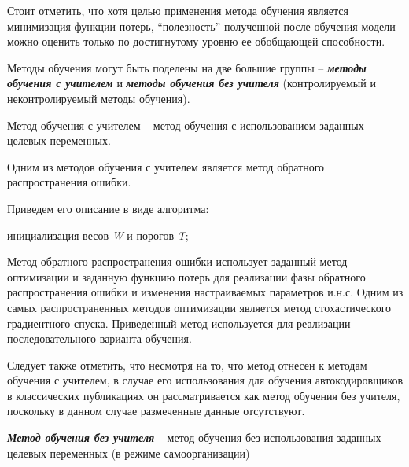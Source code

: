 Стоит отметить, что хотя целью применения метода обучения является минимизация функции потерь, ``полезность'' полученной после обучения модели можно оценить только по достигнутому уровню ее обобщающей способности.

Методы обучения могут быть поделены на две большие группы -- \textit{\textbf{методы обучения с учителем}} и \textit{\textbf{методы обучения без учителя}} (контролируемый и неконтролируемый методы обучения).

Метод обучения с учителем -- метод обучения с использованием заданных целевых переменных.

Одним из методов обучения с учителем является метод обратного распространения ошибки.

Приведем его описание в виде алгоритма:

\begin{algorithm}[H]
	инициализация весов \textit{W} и порогов \textit{T};\\
\end{algorithm}

Метод обратного распространения ошибки использует заданный метод оптимизации и заданную функцию потерь для реализации фазы обратного распространения ошибки и изменения настраиваемых параметров и.н.с. Одним из самых распространенных методов оптимизации является метод стохастического градиентного спуска. Приведенный метод используется для реализации последовательного варианта обучения.

Следует также отметить, что несмотря на то, что метод отнесен к методам обучения с учителем, в случае
его использования для обучения автокодировщиков в классических публикациях он рассматривается как
метод обучения без учителя, поскольку в данном случае размеченные данные отсутствуют.

\textbf{\textit{Метод обучения без учителя}} -- метод обучения без использования заданных целевых переменных (в режиме самоорганизации)

